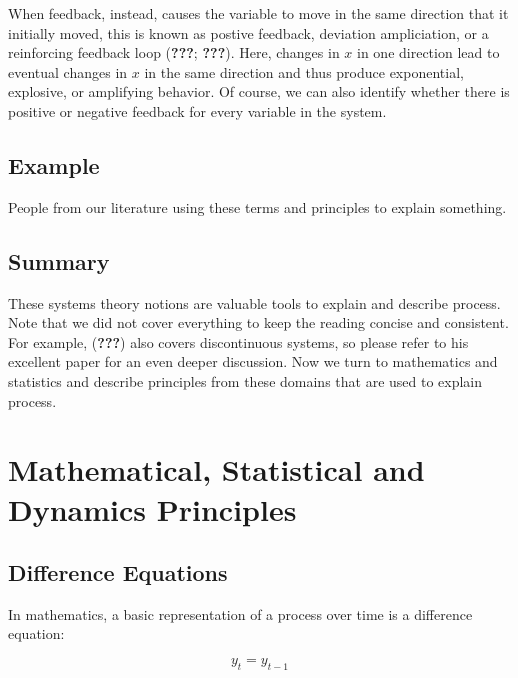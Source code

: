 \documentclass[english,,man]{apa6}
\theoremstyle{definition}
\theoremstyle{definition}
\theoremstyle{definition}
\theoremstyle{remark}
\begin{document}
When feedback, instead, causes the variable to move in the same
direction that it initially moved, this is known as postive feedback,
deviation ampliciation, or a reinforcing feedback loop ({\textbf{???}};
{\textbf{???}}). Here, changes in \(x\) in one direction lead to
eventual changes in \(x\) in the same direction and thus produce
exponential, explosive, or amplifying behavior. Of course, we can also
identify whether there is positive or negative feedback for every
variable in the system.

\hypertarget{example}{%
\subsection{Example}\label{example}}

People from our literature using these terms and principles to explain
something.

\hypertarget{summary}{%
\subsection{Summary}\label{summary}}

These systems theory notions are valuable tools to explain and describe
process. Note that we did not cover everything to keep the reading
concise and consistent. For example, ({\textbf{???}}) also covers
discontinuous systems, so please refer to his excellent paper for an
even deeper discussion. Now we turn to mathematics and statistics and
describe principles from these domains that are used to explain process.

\hypertarget{mathematical-statistical-and-dynamics-principles}{%
\section{Mathematical, Statistical and Dynamics
Principles}\label{mathematical-statistical-and-dynamics-principles}}

\hypertarget{difference-equations}{%
\subsection{Difference Equations}\label{difference-equations}}

In mathematics, a basic representation of a process over time is a
difference equation:

\begin{equation}
\label{basicD}
y_{t} = y_{t - 1}
\end{equation}
\end{document}

